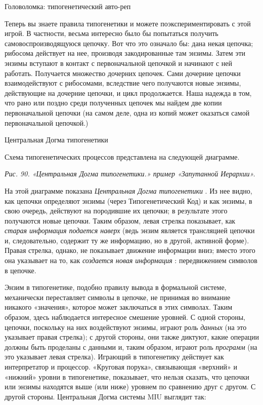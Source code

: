 Головоломка: типогенетический авто-реп

Теперь вы знаете правила типогенетики и можете поэкспериментировать с этой игрой. В частности, весьма интересно было бы попытаться получить самовоспроизводящуюся цепочку. Вот что это означало бы: дана некая цепочка; рибосома действует на нее, производя закодированные там энзимы. Затем эти энзимы вступают в контакт с первоначальной цепочкой и начинают с ней работать. Получается множество дочерних цепочек. Сами дочерние цепочки взаимодействуют с рибосомами, вследствие чего получаются новые энзимы, действующие на дочерние цепочки, и цикл продолжается. Наша надежда в том, что рано или поздно среди полученных цепочек мы найдем две копии первоначальной цепочки (на самом деле, одна из копий может оказаться самой первоначальной цепочкой.)

Центральная Догма типогенетики

Схема типогенетических процессов представлена на следующей диаграмме.

\emph{Рис. 90. «Центральная Догма типогенетики.» пример «Запутанной Иерархии».}

На этой диаграмме показана \emph{Центральная Догма типогенетики} . Из нее видно, как цепочки определяют энзимы (через Типогенетический Код) и как энзимы, в свою очередь, действуют на породившие их цепочки; в результате этого получаются новые цепочки. Таким образом, левая стрелка показывает, как \emph{старая информация подается наверх} (ведь энзим является трансляцией цепочки и, следовательно, содержит ту же информацию, но в другой, активной форме). Правая стрелка, однако, не показывает движение информации вниз; вместо этого она указывает на то, как \emph{создается новая информация} : передвижением символов в цепочке.

Энзим в типогенетике, подобно правилу вывода в формальной системе, механически переставляет символы в цепочке, не принимая во внимание никакого «значения», которое может заключаться в этих символах. Таким образом, здесь наблюдается интересное смешение уровней. С одной стороны, цепочки, поскольку на них воздействуют энзимы, играют роль \emph{данных} (на это указывает правая стрелка); с другой стороны, они также диктуют, какие операции должны быть проделаны с данными и, таким образом, играют роль \emph{программ} (на это указывает левая стрелка). Играющий в типогенетику действует как интерпретатор и процессор. «Круговая порука», связывающая «верхний» и «нижний» уровни в типогенетике, показывает, что нельзя сказать, что цепочки или энзимы находятся выше (или ниже) уровнем по сравнению друг с другом. С другой стороны. Центральная Догма системы MIU выглядит так:

